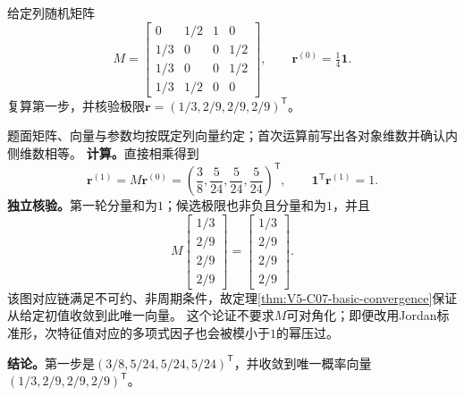 \label{struct:V5-C07-CH32}
\begin{example}\label{exm:V5-C07-basic-four}
给定列随机矩阵
\[
M=\begin{bmatrix}
0&1/2&1&0\\1/3&0&0&1/2\\1/3&0&0&1/2\\1/3&1/2&0&0
\end{bmatrix},
\qquad \boldsymbol r^{(0)}=\tfrac14\boldsymbol1.
\]
复算第一步，并核验极限$\boldsymbol r=(1/3,2/9,2/9,2/9)^{\mathsf T}$。
\end{example}
\begin{solution}
\SolGiven 题面矩阵、向量与参数均按既定列向量约定；首次运算前写出各对象维数并确认内侧维数相等。
\SolDerive
\textbf{计算。}直接相乘得到
\[
\boldsymbol r^{(1)}=M\boldsymbol r^{(0)}
=\left(\frac38,\frac5{24},\frac5{24},\frac5{24}\right)^{\mathsf T},
\qquad
\boldsymbol1^{\mathsf T}\boldsymbol r^{(1)}=1.
\]
\textbf{独立核验。}第一轮分量和为$1$；候选极限也非负且分量和为$1$，并且
\[
M\begin{bmatrix}1/3\\2/9\\2/9\\2/9\end{bmatrix}
=\begin{bmatrix}1/3\\2/9\\2/9\\2/9\end{bmatrix}.
\]
该图对应链满足不可约、非周期条件，故定理\ref{thm:V5-C07-basic-convergence}保证从给定初值收敛到此唯一向量。
这个论证不要求$M$可对角化；即便改用Jordan标准形，次特征值对应的多项式因子也会被模小于$1$的幂压过。

\textbf{结论。}第一步是$(3/8,5/24,5/24,5/24)^{\mathsf T}$，并收敛到唯一概率向量$(1/3,2/9,2/9,2/9)^{\mathsf T}$。
\end{solution}

